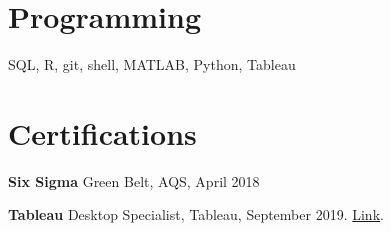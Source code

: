 \documentclass[margin, line]{res}
\begin{document}
\begin{resume}
\section{\sc Programming} 
SQL, R, git, shell, MATLAB, Python, Tableau


\section{\sc Certifications }
{\bf Six Sigma} Green Belt, AQS, April 2018
\vspace*{-3mm}

{\bf Tableau} Desktop Specialist, Tableau, September 2019. \href{https://www.credly.com/badges/e9a605a8-1977-4a1c-ab24-149a37c7fb36/linked_in_profile}{Link}.
\vspace*{-3mm}

\end{resume}
\end{document}
